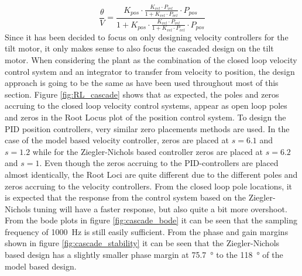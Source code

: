 \documentclass[../../main.tex]{subfiles}
\begin{document}
\begin{equation} \label{eq:tf_cascaded_design}
    \frac{\theta}{V}=\frac{K_{pos}\cdot\frac{K_{vel}\cdot P_{vel}}{1+K_{vel}\cdot P_{vel}}\cdot P_{pos}}{1+ K_{pos}\cdot\frac{K_{vel}\cdot P_{vel}}{1+K_{vel}\cdot P_{vel}}\cdot P_{pos}}
\end{equation}
Since it has been decided to focus on only designing velocity controllers for the tilt motor, it only makes sense to also focus the cascaded design on the tilt motor.
When considering the plant as the combination of the closed loop velocity control system and an integrator to transfer from velocity to position, the design approach is going to be the same as have been used throughout most of this section. 
Figure \ref{fig:RL_cascade} shows that as expected, the poles and zeros accruing to the closed loop velocity control systems, appear as open loop poles and zeros in the Root Locus plot of the position control system. To design the PID position controllers, very similar zero placements methods  are used. In the case of the model based velocity controller, zeros are placed at $s = 6.1$ and $s = 1.2$ while for the Ziegler-Nichols based controller zeros are placed at $s = 6.2$ and $s = 1$. Even though the zeros accruing to the PID-controllers are placed almost identically, the Root Loci are quite different due to the different poles and zeros accruing to the velocity controllers. From the closed loop pole locations, it is expected that the response from the control system based on the Ziegler-Nichols tuning will have a faster response, but also quite a bit more overshoot. From the bode plots in figure \ref{fig:cascade_bode} it can be seen that the sampling frequency of \SI{1000}{\hertz} is still easily sufficient. From the phase and gain margins shown in figure \ref{fig:cascade_stability} it can be seen that the Ziegler-Nichols based design has a slightly smaller phase margin at \SI{75.7}{\degree} to the \SI{118}{\degree} of the model based design.
\end{document}
